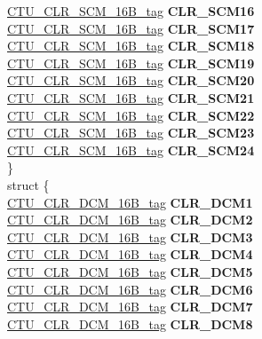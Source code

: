 \begin{DoxyCompactItemize}
\begin{tabbing}
\>\>\mbox{\hyperlink{unionCTU__CLR__SCM__16B__tag}{CTU\_CLR\_SCM\_16B\_tag}} {\bfseries CLR\_SCM16}\\
\>\>\mbox{\hyperlink{unionCTU__CLR__SCM__16B__tag}{CTU\_CLR\_SCM\_16B\_tag}} {\bfseries CLR\_SCM17}\\
\>\>\mbox{\hyperlink{unionCTU__CLR__SCM__16B__tag}{CTU\_CLR\_SCM\_16B\_tag}} {\bfseries CLR\_SCM18}\\
\>\>\mbox{\hyperlink{unionCTU__CLR__SCM__16B__tag}{CTU\_CLR\_SCM\_16B\_tag}} {\bfseries CLR\_SCM19}\\
\>\>\mbox{\hyperlink{unionCTU__CLR__SCM__16B__tag}{CTU\_CLR\_SCM\_16B\_tag}} {\bfseries CLR\_SCM20}\\
\>\>\mbox{\hyperlink{unionCTU__CLR__SCM__16B__tag}{CTU\_CLR\_SCM\_16B\_tag}} {\bfseries CLR\_SCM21}\\
\>\>\mbox{\hyperlink{unionCTU__CLR__SCM__16B__tag}{CTU\_CLR\_SCM\_16B\_tag}} {\bfseries CLR\_SCM22}\\
\>\>\mbox{\hyperlink{unionCTU__CLR__SCM__16B__tag}{CTU\_CLR\_SCM\_16B\_tag}} {\bfseries CLR\_SCM23}\\
\>\>\mbox{\hyperlink{unionCTU__CLR__SCM__16B__tag}{CTU\_CLR\_SCM\_16B\_tag}} {\bfseries CLR\_SCM24}\\
\>\} \\
\mbox{\label{unionCTU__struct__tag_1_1_0D1894_ad89a206daed483350cee438be9d86835}} 
\>struct \{\\
\>\>\mbox{\hyperlink{unionCTU__CLR__DCM__16B__tag}{CTU\_CLR\_DCM\_16B\_tag}} {\bfseries CLR\_DCM1}\\
\>\>\mbox{\hyperlink{unionCTU__CLR__DCM__16B__tag}{CTU\_CLR\_DCM\_16B\_tag}} {\bfseries CLR\_DCM2}\\
\>\>\mbox{\hyperlink{unionCTU__CLR__DCM__16B__tag}{CTU\_CLR\_DCM\_16B\_tag}} {\bfseries CLR\_DCM3}\\
\>\>\mbox{\hyperlink{unionCTU__CLR__DCM__16B__tag}{CTU\_CLR\_DCM\_16B\_tag}} {\bfseries CLR\_DCM4}\\
\>\>\mbox{\hyperlink{unionCTU__CLR__DCM__16B__tag}{CTU\_CLR\_DCM\_16B\_tag}} {\bfseries CLR\_DCM5}\\
\>\>\mbox{\hyperlink{unionCTU__CLR__DCM__16B__tag}{CTU\_CLR\_DCM\_16B\_tag}} {\bfseries CLR\_DCM6}\\
\>\>\mbox{\hyperlink{unionCTU__CLR__DCM__16B__tag}{CTU\_CLR\_DCM\_16B\_tag}} {\bfseries CLR\_DCM7}\\
\>\>\mbox{\hyperlink{unionCTU__CLR__DCM__16B__tag}{CTU\_CLR\_DCM\_16B\_tag}} {\bfseries CLR\_DCM8}\\

\end{tabbing}
\end{DoxyCompactItemize}

